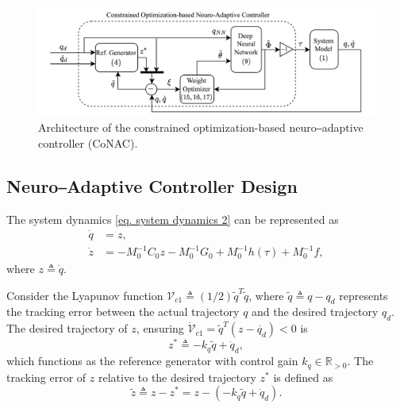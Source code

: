 \documentclass[lettersize,journal]{IEEEtran}
\begin{document}
\begin{figure}[!t]
    \centering
    \includegraphics[width=0.7\linewidth]{fig/Controller.drawio.png}
    \caption{Architecture of the constrained optimization-based neuro‒adaptive controller (CoNAC).}
    \label{fig: controller}
\end{figure}

\subsection{Neuro‒Adaptive Controller Design}\label{sec:NAC}

The system dynamics \eqref{eq. system dynamics 2} can be represented as
\begin{equation}
    \begin{aligned}
        \dot {q} &= {z},\\
        \dot {z} &= -M_0^{-1} C_0 {z}-M_0^{-1} G_0+M_0^{-1} h(\tau) + M_0^{-1} f,
    \end{aligned}
    \label{eq. x dynamics}
\end{equation}
where ${z}\triangleq \dot q$.

Consider the Lyapunov function ${\mathcal V}_{c1}\triangleq(1/2){\tilde q}^T  {\tilde q}$, where ${\tilde q}\triangleq {q}-{q_d}$ represents the tracking error between the actual trajectory ${q}$ and the desired trajectory $q_d$. 
The desired trajectory of ${z}$, ensuring $\dot {\mathcal V}_{c1}={\tilde q}^T  ({z}-\dot {q_d})<0$ is 
\begin{equation}
    {z^*} \triangleq -{k_q}{\tilde q} + \dot q_d,
\end{equation}
which functions as the reference generator with control gain ${k_q} \in\mathbb{R}_{>0}$. The tracking error of ${z}$ relative to the desired trajectory ${z^*}$ is defined as
\begin{equation}
    {\tilde z} \triangleq {z} - {z^*} = {z} - (-{k_q}{\tilde q} + \dot q_d).
    \label{eq. e2}
\end{equation}
\end{document}
